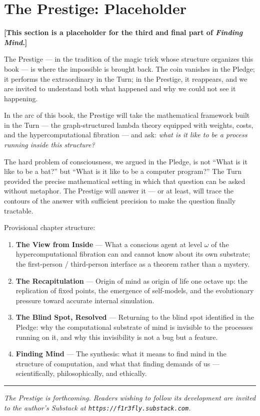 \chapter*{The Prestige: Placeholder}

\noindent\textbf{[This section is a placeholder for the third and final part of \emph{Finding Mind}.]}

\bigskip

The Prestige --- in the tradition of the magic trick whose structure
organizes this book --- is where the impossible is brought back.
The coin vanishes in the Pledge; it performs the extraordinary in the
Turn; in the Prestige, it reappears, and we are invited to understand
both what happened and why we could not see it happening.

\bigskip

In the arc of this book, the Prestige will take the mathematical
framework built in the Turn --- the graph-structured lambda theory
equipped with weights, costs, and the hypercomputational fibration ---
and ask: \emph{what is it like to be a process running inside this
structure?}

The hard problem of consciousness, we argued in the Pledge, is not
``What is it like to be a bat?'' but ``What is it like to be a
computer program?''
The Turn provided the precise mathematical setting in which that
question can be asked without metaphor.
The Prestige will answer it --- or at least, will trace the
contours of the answer with sufficient precision to make the
question finally tractable.

\bigskip

Provisional chapter structure:

\begin{enumerate}
  \item \textbf{The View from Inside} --- What a conscious agent at level $\omega$
        of the hypercomputational fibration can and cannot know about its
        own substrate; the first-person / third-person interface as a
        theorem rather than a mystery.
  \item \textbf{The Recapitulation} --- Origin of mind as origin of life one
        octave up: the replication of fixed points, the emergence of
        self-models, and the evolutionary pressure toward accurate
        internal simulation.
  \item \textbf{The Blind Spot, Resolved} --- Returning to the blind spot
        identified in the Pledge: why the computational substrate of
        mind is invisible to the processes running on it, and why this
        invisibility is not a bug but a feature.
  \item \textbf{Finding Mind} --- The synthesis: what it means to find
        mind in the structure of computation, and what that finding
        demands of us --- scientifically, philosophically, and
        ethically.
\end{enumerate}

\bigskip
\noindent\hrule
\bigskip

\noindent\textit{The Prestige is forthcoming.
Readers wishing to follow its development are invited to the
author's Substack at \texttt{https://f1r3fly.substack.com}.}
